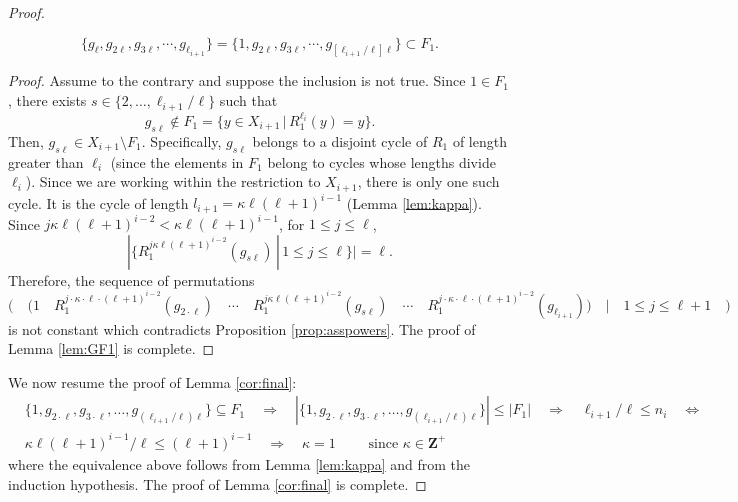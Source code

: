 \documentclass[10pt,a4paper]{amsart}
\begin{document}
\begin{proof}
\begin{lemma}\label{lem:GF1}
$$\{ g_{\ell}, g_{2\ell}, g_{3\ell}, \cdots  , g_{\ell_{i+1}}  \} = \{ 1, g_{2\ell}, g_{3\ell}, \cdots , g_{[\ell_{i+1}/\ell]\ell}\}\subset F_1 .$$
\end{lemma}
\begin{proof}
Assume to the contrary and suppose the inclusion is not true. Since $1\in F_1$, there exists $s\in \{ 2, \dots , \ell_{i+1}/\ell \}$ such that $$g_{s\ell}\notin F_1=\{ y\in X_{i+1}\,|\, R_1^{\ell_i}(y)=y \} .$$ Then, $g_{s\ell}\in X_{i+1}\setminus F_1$. Specifically, $g_{s\ell}$ belongs to a disjoint cycle of $R_1$ of length greater than $\ell_i$ (since the elements in $F_1$ belong to cycles whose lengths divide $\ell_i$). Since we are working within the restriction to $X_{i+1}$, there is only one such cycle. It is the cycle of length $l_{i+1}=\kappa \ell (\ell+1)^{i-1}$ (Lemma \ref{lem:kappa}). Since $j\kappa \ell(\ell +1)^{i-2}< \kappa\ell(\ell +1)^{i-1}$, for $1\leq j \leq \ell$, $$|\{ R_1^{j\kappa \ell(\ell +1)^{i-2}}(g_{s\ell})\, |\, 1\leq j \leq \ell \}|=\ell .$$  Therefore, the sequence of permutations $$\Bigg(\quad  \bigg(1\quad R_1^{j\cdot\kappa\cdot\ell\cdot(\ell+1)^{i-2}}(g_{2\cdot\ell})\quad\cdots\quad R_1^{j\kappa \ell(\ell +1)^{i-2}}(g_{s\ell})\quad\cdots\quad R_1^{j\cdot\kappa\cdot\ell\cdot(\ell+1)^{i-2}}(g_{\ell_{i+1}})\bigg)\quad |\quad 1\leq j \leq \ell+1 \quad\Bigg) $$ is not constant which contradicts Proposition \ref{prop:asspowers}. The proof of Lemma \ref{lem:GF1} is complete.

\end{proof}
We now resume the proof of Lemma \ref{cor:final}: \begin{align*}
&\{1,g_{2\cdot\ell},g_{3\cdot\ell},\dots,g_{(\ell_{i+1}/\ell)\ell}\}\subseteq F_1 \quad \Longrightarrow \quad |\{1,g_{2\cdot\ell},g_{3\cdot\ell},\dots,g_{(\ell_{i+1}/\ell)\ell}\}|\leq |F_1| \quad \Longrightarrow \quad \ell_{i+1}/\ell \leq n_i \quad \Longleftrightarrow \quad \\
&\kappa \ell(\ell+1)^{i-1}/\ell \leq (\ell+1)^{i-1} \quad \Longrightarrow \quad \kappa = 1 \qquad \text{ since }\kappa\in\mathbf{Z}^+
\end{align*}
where the equivalence above follows from Lemma \ref{lem:kappa} and from the induction hypothesis. The proof of Lemma \ref{cor:final} is complete.



\end{proof}
\end{document}
